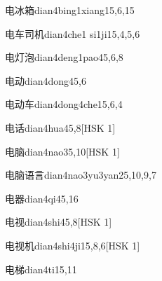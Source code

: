 \begin{entry}{电冰箱}{dian4bing1xiang1}{5,6,15}
\end{entry}

\begin{entry}{电车司机}{dian4che1 si1ji1}{5,4,5,6}
\end{entry}

\begin{entry}{电灯泡}{dian4deng1pao4}{5,6,8}
\end{entry}

\begin{entry}{电动}{dian4dong4}{5,6}
\end{entry}

\begin{entry}{电动车}{dian4dong4che1}{5,6,4}
\end{entry}

\begin{entry}{电话}{dian4hua4}{5,8}[HSK 1]
\end{entry}

\begin{entry}{电脑}{dian4nao3}{5,10}[HSK 1]
\end{entry}

\begin{entry}{电脑语言}{dian4nao3yu3yan2}{5,10,9,7}
\end{entry}

\begin{entry}{电器}{dian4qi4}{5,16}
\end{entry}

\begin{entry}{电视}{dian4shi4}{5,8}[HSK 1]
\end{entry}

\begin{entry}{电视机}{dian4shi4ji1}{5,8,6}[HSK 1]
\end{entry}

\begin{entry}{电梯}{dian4ti1}{5,11}
\end{entry}

